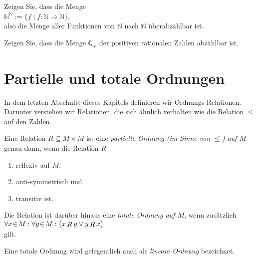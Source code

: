 \exercise
Zeigen Sie, dass die Menge
\\[0.2cm]
\hspace*{1.3cm}
$\mathbb{N}^\mathbb{N} := \{ f \mid f: \mathbb{N} \rightarrow \mathbb{N} \}$,
\\[0.2cm]
also die Menge aller Funktionen von $\mathbb{N}$ nach $\mathbb{N}$ \"{u}berabz\"{a}hlbar ist.
\exend

\exercise
Zeigen Sie, dass die Menge $\mathbb{Q}_+$ der positiven rationalen Zahlen abz\"{a}hlbar ist.
\exend



\section{Partielle und totale Ordnungen}
In dem letzten Abschnitt dieses Kapitels definieren wir Ordnungs-Relationen.  Darunter verstehen wir
Relationen, die sich \"{a}hnlich verhalten wie die Relation $\leq$ auf den Zahlen.

\begin{Definition}
  Eine Relation $R \subseteq M \times M$  ist eine 
  \emph{partielle Ordnung (im Sinne von $\leq$) auf $M$} genau dann, wenn die Relation $R$
  \begin{enumerate}
  \item reflexiv auf $M$,
  \item anti-symmetrisch und
  \item transitiv ist.
  \end{enumerate}
  Die Relation ist dar\"{u}ber hinaus eine \emph{totale Ordnung auf $M$}, wenn zus\"{a}tzlich
  \\[0.2cm]
  \hspace*{1.3cm} $\forall x \!\in\! M : \forall y \!\in\! M :\bigl( x\mathop{R}y \vee y \mathop{R} x\bigr)$
  \\[0.2cm]
  gilt. \eox
\end{Definition}

\remark
Eine totale Ordnung wird gelegentlich auch als \emph{lineare Ordnung} bezeichnet. \eox

